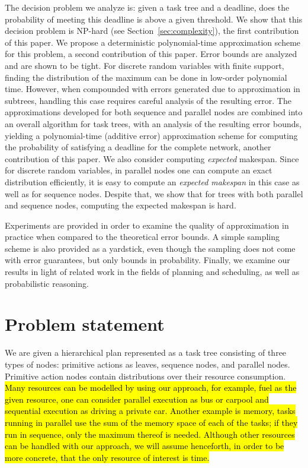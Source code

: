 \documentclass[review]{elsarticle}
\begin{document}
The decision problem we analyze is: given a task tree and a deadline, does the probability of meeting this deadline is above a given threshold. We show that this decision problem is NP-hard (see Section~\ref{sec:complexity}), the first contribution of this paper. We propose a deterministic polynomial-time approximation scheme for this problem, a second contribution of this paper. Error bounds are analyzed and are shown to be tight. For discrete random variables with finite support, finding the distribution of the maximum can be done in low-order polynomial time. However, when compounded with errors generated due to approximation in subtrees, handling this case requires careful analysis of the resulting error. The approximations developed for both sequence and parallel nodes are combined into an overall algorithm for task trees, with an analysis of the resulting error bounds, yielding a polynomial-time (additive error) approximation scheme for computing the probability of satisfying a deadline for the complete network, another contribution of this paper. 
We also consider computing {\em expected} makespan. Since for discrete random variables, in parallel nodes one can compute an exact distribution efficiently, it is easy to compute an {\em expected makespan} in this case as well as for sequence nodes. Despite that,  we show that for trees with both parallel and sequence nodes, computing the expected makespan is hard.


Experiments are provided in order to examine the quality of approximation in practice when compared to the theoretical error bounds. A simple sampling scheme is also provided as a yardstick, even though the sampling does not come with error guarantees, but only bounds in probability. Finally, we examine our results in light of related work in the fields of planning and scheduling, as well as
probabilistic reasoning. 

\section{Problem statement}\label{sec:formal}

We are given a hierarchical plan represented as a task tree consisting of three types of nodes: primitive actions as leaves, sequence nodes, and parallel nodes.
Primitive action nodes contain distributions over their resource consumption. \hl{Many resources can be modelled by using our approach, for example, fuel as the given resource, one can consider parallel execution as bus or carpool and sequential execution as driving a private car. Another example is memory, tasks running in parallel use the sum of the memory space of each of the tasks; if they run in sequence, only the maximum thereof is needed.
Although other resources can be handled with our approach, we will assume henceforth, in order to be more concrete, that the only resource of interest is time.}
\end{document}

